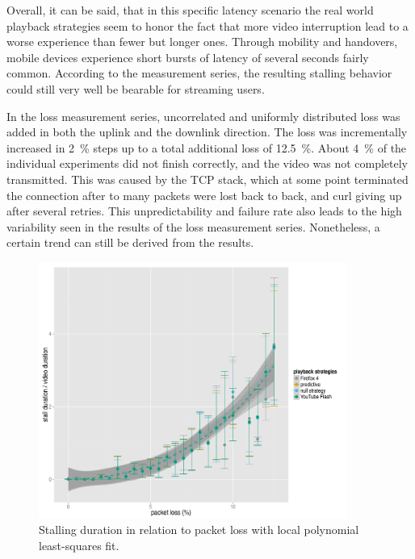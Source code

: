 Overall, it can be said, that in this specific latency scenario the real world playback strategies seem to honor the fact that more video interruption lead to a worse experience than fewer but longer ones.  Through mobility and handovers, mobile devices experience short bursts of latency of several seconds fairly common. According to the measurement series, the resulting stalling behavior could still very well be bearable for streaming users.

In the loss measurement series, uncorrelated and uniformly distributed loss was added in both the uplink and the downlink direction. The loss was incrementally increased in \SI{2}{\percent} steps up to a total additional loss of \SI{12.5}{\percent}. About \SI{4}{\percent} of the individual experiments did not finish correctly, and the video was not completely transmitted. This was caused by the \gls{TCP} stack, which at some point terminated the connection after to many packets were lost back to back, and curl giving up after several retries. This unpredictability and failure rate also leads to the high variability seen in the results of the loss measurement series. Nonetheless, a certain trend can still be derived from the results.


\begin{figure}[htb]
    \centering
    \includegraphics[width=0.9\textwidth]{images/R-playbackemulation-stallduration-loss.pdf}
    \caption{Stalling duration in relation to packet loss with local polynomial least-squares fit.}
    \label{c3:fig:eval-loss-stallingtime}
\end{figure}


